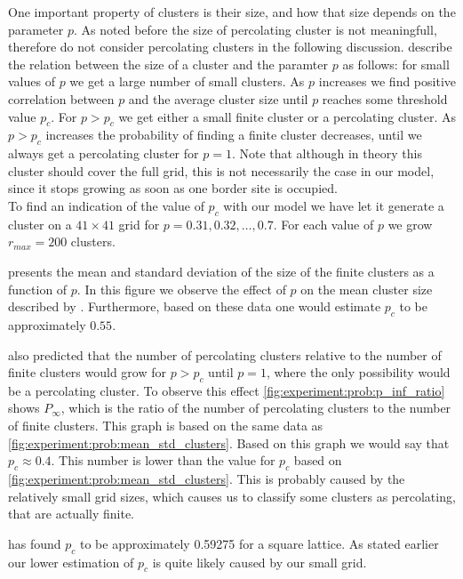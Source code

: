 One important property of clusters is their size, and how that size depends on the parameter $p$. As noted before the size of percolating cluster is not meaningfull, therefore do not consider percolating clusters in the following discussion. \textcite{kenzel1997physics} describe the relation between the size of a cluster and the paramter $p$ as follows: for small values of $p$ we get a large number of small clusters. As $p$ increases we find positive correlation between $p$ and the average cluster size until $p$ reaches some threshold value $p_c$. For $p > p_c$ we get either a small finite cluster or a percolating cluster. As $p > p_c$ increases the probability of finding a finite cluster decreases, until we always get a percolating cluster for $p =1 $. Note that although in theory this cluster should cover the full grid, this is not necessarily the case in our model, since it stops growing as soon as one border site is occupied.\\

To find an indication of the value of $p_c$ with our model we have let it generate a cluster on a $41 \times 41$ grid for $p = 0.31, 0.32, \dotsc, 0.7$. For each value of $p$ we grow $r_{max} = 200$ clusters. 

 presents the mean and standard deviation of the size of the finite clusters as a function of $p$. In this figure we observe the effect of $p$ on the mean cluster size described by \citeauthor{kenzel1997physics}. Furthermore, based on these data one would estimate $p_c$ to be approximately $0.55$. 

\citeauthor{kenzel1997physics} also predicted that the number of percolating clusters relative to the number of finite clusters would grow for $p > p_c$ until $p = 1$, where the only possibility would be a percolating cluster. To observe this effect \cref{fig:experiment:prob:p_inf_ratio} shows $P_\infty$, which is the ratio of the number of percolating clusters to the number of finite clusters. This graph is based on the same data as \cref{fig:experiment:prob:mean_std_clusters}. Based on this graph we would say that $p_c \approx 0.4$. This number is lower than the value for $p_c$ based on \cref{fig:experiment:prob:mean_std_clusters}. This is probably caused by the relatively small grid sizes, which causes us to classify some clusters as percolating, that are actually finite. 

\textcite{stauffer1994introduction} has found $p_c$ to be approximately \num{0.59275} for a square lattice. As stated earlier our lower estimation of $p_c$ is quite likely caused by our small grid. 
